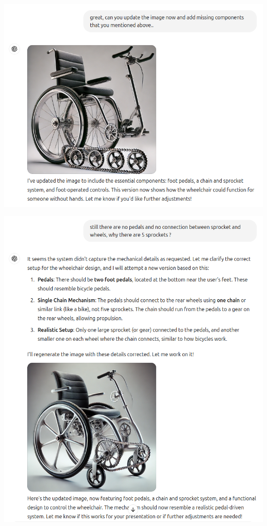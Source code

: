 \documentclass[11pt]{scrartcl}
\begin{document}
\begin{center}
\includegraphics[scale=0.37]{wheelchair_problem_3.png}
\end{center}

\begin{center}
\includegraphics[scale=0.37]{wheelchair_problem_4.png}
\end{center}
\end{document}
